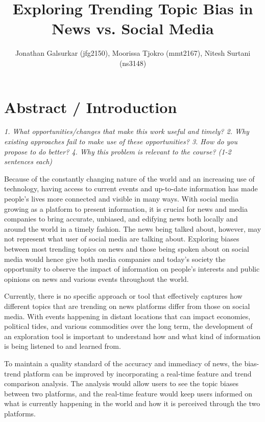 \documentclass{proc}
\begin{document}
\title{Exploring Trending Topic Bias in News vs. Social Media }

\author{Jonathan Galsurkar (jfg2150), Moorissa Tjokro (mmt2167), Nitesh Surtani (ns3148)}

\maketitle

\section{Abstract / Introduction}

\emph{1. What opportunities/changes that make this work useful and timely?
2. Why existing approaches fail to make use of these opportunities?
3. How do you propose to do better?
4. Why this problem is relevant to the course?
(1-2 sentences each)} 

Because of the constantly changing nature of the world and an increasing use of technology, having access to current events and up-to-date information has made people's lives more connected and visible in many ways. With social media growing as a platform to present information, it is crucial for news and media companies to bring accurate, unbiased, and edifying news both locally and around the world in a timely fashion. The news being talked about, however, may not represent what user of social media are talking about. Exploring biases between most trending topics on news and those being spoken about on social media would hence give both media companies and today's society the opportunity to observe the impact of information on people's interests and public opinions on news and various events throughout the world.

Currently, there is no specific approach or tool that effectively captures how different topics that are trending on news platforms differ from those on social media. With events happening in distant locations that can impact economies, political tides, and various commodities over the long term, the development of an exploration tool is important to understand how and what kind of information is being listened to and learned from.  

To maintain a quality standard of the accuracy and immediacy of news, the bias-trend platform can be improved by incorporating a real-time feature and trend comparison analysis. The analysis would allow users to see the topic biases between two platforms, and the real-time feature would keep users informed on what is currently happening in the world and how it is perceived through the two platforms.
\end{document}
